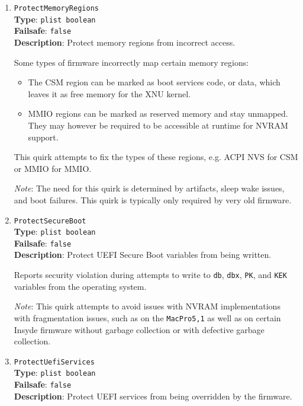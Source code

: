 \documentclass[]{article}
\providecommand{\tightlist}{%
  \setlength{\itemsep}{0pt}\setlength{\parskip}{0pt}}
\begin{document}
\begin{enumerate}
\item
  \texttt{ProtectMemoryRegions}\\
  \textbf{Type}: \texttt{plist\ boolean}\\
  \textbf{Failsafe}: \texttt{false}\\
  \textbf{Description}: Protect memory regions from incorrect access.

  Some types of firmware incorrectly map certain memory regions:

  \begin{itemize}
    \tightlist
    \item The CSM region can be marked as boot services code, or data, which
      leaves it as free memory for the XNU kernel.
    \item MMIO regions can be marked as reserved memory and stay unmapped.
      They may however be required to be accessible at runtime for NVRAM support.
  \end{itemize}

  This quirk attempts to fix the types of these regions, e.g. ACPI NVS for
  CSM or MMIO for MMIO.

  \emph{Note}: The need for this quirk is determined by artifacts, sleep
  wake issues, and boot failures. This quirk is typically only required by
  very old firmware.

\item
  \texttt{ProtectSecureBoot}\\
  \textbf{Type}: \texttt{plist\ boolean}\\
  \textbf{Failsafe}: \texttt{false}\\
  \textbf{Description}: Protect UEFI Secure Boot variables from being written.

  Reports security violation during attempts to write to \texttt{db}, \texttt{dbx},
  \texttt{PK}, and \texttt{KEK} variables from the operating system.

  \emph{Note}: This quirk attempts to avoid issues with NVRAM implementations with
  fragmentation issues, such as on the \texttt{MacPro5,1} as well as on certain
  Insyde firmware without garbage collection or with defective garbage collection.

\item
  \texttt{ProtectUefiServices}\\
  \textbf{Type}: \texttt{plist\ boolean}\\
  \textbf{Failsafe}: \texttt{false}\\
  \textbf{Description}: Protect UEFI services from being overridden by the firmware.


\end{enumerate}
\end{document}
